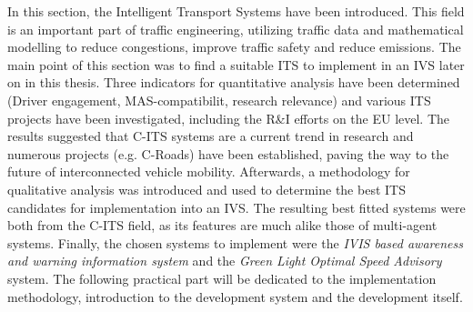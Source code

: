 \documentclass[main.tex]{subfiles}
\begin{document}
In this section, the Intelligent Transport Systems have been introduced. This field is an
important part of traffic engineering, utilizing traffic data and mathematical modelling to
reduce congestions, improve traffic safety and reduce emissions. The main point of this section
was to find a suitable ITS to implement in an IVS later on in this thesis. Three indicators for
quantitative analysis have been determined (Driver engagement, MAS-compatibilit, research
relevance) and various ITS projects have been investigated, including the R\&I efforts on the
EU level. The results suggested that C-ITS systems are a current trend in research and numerous
projects (e.g. C-Roads) have been established, paving the way to the future of interconnected
vehicle mobility. Afterwards, a methodology for qualitative analysis was introduced and used to
determine the best ITS candidates for implementation into an IVS. The resulting best fitted
systems were both from the C-ITS field, as its features are much alike those of multi-agent
systems. Finally, the chosen systems to implement were the \emph{IVIS based awareness and
warning information system} and the \emph{Green Light Optimal Speed Advisory} system. The
following practical part will be dedicated to the implementation methodology, introduction to
the development system and the development itself.
\end{document}
